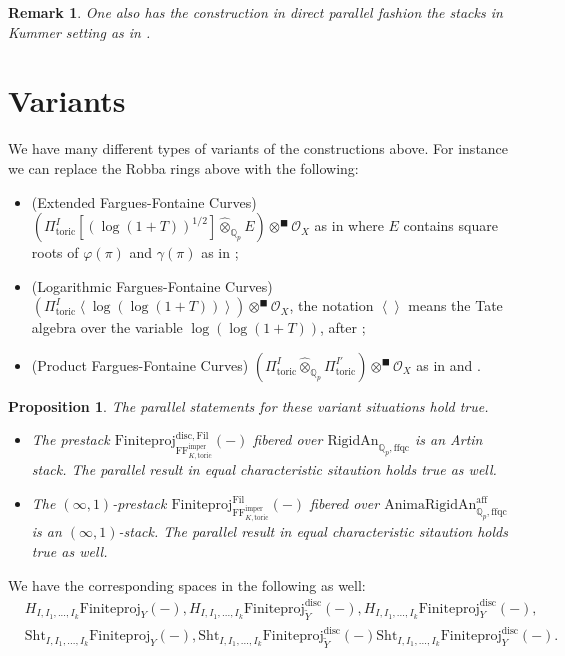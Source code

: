 \documentclass[12pt]{article}
\newtheorem{proposition}{Proposition}
\newtheorem{remark}{Remark}
\begin{document}
\begin{remark}
One also has the construction in direct parallel fashion the stacks in Kummer setting as in \cite{EG}.	
\end{remark}

\section{Variants}

We have many different types of variants of the constructions above. For instance we can replace the Robba rings above with the following:
\begin{itemize}
\item[A] (Extended Fargues-Fontaine Curves) $(\Pi^I_\mathrm{toric}[(\log(1+T))^{1/2}]\widehat{\otimes}_{\mathbb{Q}_p}E)\otimes^\blacksquare \mathcal{O}_X$ as in \cite{BS} where $E$ contains square roots of $\varphi(\pi)$ and $\gamma(\pi)$ as in \cite{BS}; 
\item[B] (Logarithmic Fargues-Fontaine Curves) $(\Pi^I_\mathrm{toric}\left<\log(\log(1+T))\right>)\otimes^\blacksquare \mathcal{O}_X$, the notation $\left<\right>$ means the Tate algebra over the variable $\log(\log(1+T))$, after \cite{Fon};
\item[C] (Product Fargues-Fontaine Curves) $(\Pi^I_\mathrm{toric}\widehat{\otimes}_{\mathbb{Q}_p}\Pi^{I'}_\mathrm{toric})\otimes^\blacksquare \mathcal{O}_X$ as in \cite{CKZ} and \cite{PZ}.
\end{itemize}

\begin{proposition}
The parallel statements for these variant situations hold true. 
\begin{itemize}
\item[$\square$] The prestack $\mathrm{Finiteproj}^{\mathrm{disc},\mathrm{Fil}}_{\mathrm{FF}^\mathrm{imper}_{K,\mathrm{toric}}}(-)$ fibered over $\mathrm{RigidAn}_{\mathbb{Q}_p,\mathrm{ffqc}}$ is an Artin stack. The parallel result in equal characteristic sitaution holds true as well.
\item[$\square$] The $(\infty,1)$-prestack $\mathrm{Finiteproj}^{\mathrm{Fil}}_{\mathrm{FF}^\mathrm{imper}_{K,\mathrm{toric}}}(-)$ fibered over $\mathrm{AnimaRigidAn}^\mathrm{aff}_{\mathbb{Q}_p,\mathrm{ffqc}}$ is an $(\infty,1)$-stack. The parallel result in equal characteristic sitaution holds true as well.
\end{itemize}
\end{proposition}

We have the corresponding spaces in the following as well:
\begin{align}
&H_{I,I_1,...,I_k}\mathrm{Finiteproj}_{{Y}}(-), H_{I,I_1,...,I_k}\mathrm{Finiteproj}^\mathrm{disc}_{\widetilde{Y}}(-), H_{I,I_1,...,I_k}\mathrm{Finiteproj}^\mathrm{disc}_{Y}(-),\\ 
&\mathrm{Sht}_{I,I_1,...,I_k}\mathrm{Finiteproj}_{{Y}}(-), \mathrm{Sht}_{I,I_1,...,I_k}\mathrm{Finiteproj}^\mathrm{disc}_{\widetilde{Y}}(-) \mathrm{Sht}_{I,I_1,...,I_k}\mathrm{Finiteproj}^\mathrm{disc}_{Y}(-).
\end{align}
\end{document}
